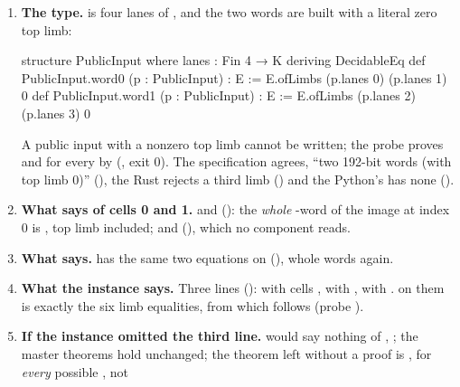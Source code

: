\begin{sloppypar}
\begin{enumerate}
\item \textbf{The type.}  is four lanes of , and the two words are
  built with a literal zero top limb:
\begin{leancode}
structure PublicInput where
  lanes : Fin 4 → K
  deriving DecidableEq
def PublicInput.word0 (p : PublicInput) : E := E.ofLimbs (p.lanes 0) (p.lanes 1) 0
def PublicInput.word1 (p : PublicInput) : E := E.ofLimbs (p.lanes 2) (p.lanes 3) 0
\end{leancode}
  A public input with a nonzero top limb cannot be written; the probe proves
   and  for every  by 
  (, exit 0). The specification agrees, \enquote{two 192-bit words (with
  top limb 0)} (), the Rust rejects a third
  limb () and the Python's  has none
  ().
\item \textbf{What  says of cells 0 and 1.}
   and 
  (): the \emph{whole} -word of the image at index 0 is
  , top limb included; and  (),
  which no component reads.
\item \textbf{What  says.}  has the same two
  equations on  (), whole words again.
\item \textbf{What the instance says.} Three lines ():  with cells
  ,  with ,
   with .  on them is exactly the six limb
  equalities, from which  follows
  (probe ).
\item \textbf{If the instance omitted the third line.}  would say nothing of
  , ; the master theorems hold unchanged; the theorem left without a
  proof is \textbf{}, for \emph{every} possible , not

\end{enumerate}
\end{sloppypar}
